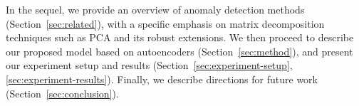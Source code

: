 \begin{comment}
Figure~\ref{mse} shows the output of using a robust and deep autencoder
to recover images. The data set consists of images of dogs where each
image has been corrupted with a small amount of noise. The proposed
autoencoder is able to reconstruct the dog images but fails to
properly reconstruct an image which has a dog and a boy. In fact,
the image of the dog with the boy was discovered as part of the
anomaly detection process using autoencoders.
\begin{figure}[!t]
	\centering
	\texttt{[image: images/otherClass]}
	\caption{Illustration of the  anomaly detection capability of deep inductive convolutional autoencoders.
		The data set consists of ``dog'' images (first column).
		Our proposed robust autoencoder decomposes an image $\X = \hat{\X} + \N$.
		The $\hat{\X}$ (second column) shows the reconstructed image and $\N$ (third column) shows the difference between the original and the reconstructed image.
		In the first row, a dog image is normal, while in the second row, an image of a flight  (an anomaly) is  reconstructed with high mean square error.}
	\label{mse}
	\vspace{-\baselineskip}
\end{figure}
\end{comment}

In the sequel,
we provide an overview of anomaly detection methods (Section~\ref{sec:related}), with a specific emphasis on matrix decomposition techniques
such as PCA and its robust extensions.
We then proceed to describe our proposed model based on autoencoders (Section~\ref{sec:method}),
and present our experiment setup and results (Section~\ref{sec:experiment-setup}, \ref{sec:experiment-results}).
Finally, we describe directions for future work (Section~\ref{sec:conclusion}).
